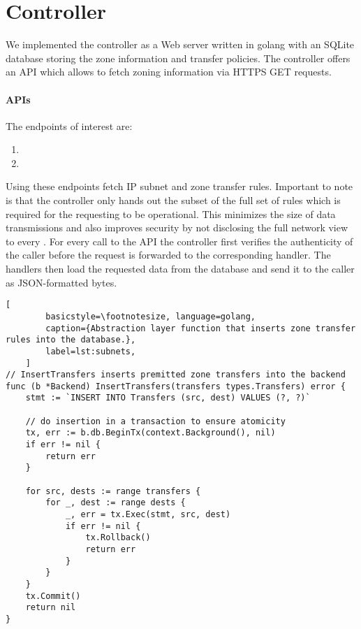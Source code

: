 \section{Controller}
\label{sec:controller}

We implemented the controller as a Web server written in golang with an SQLite database storing the
zone information and transfer policies. The controller offers an API which allows
\tps to fetch zoning information via HTTPS GET requests.

\paragraph{APIs}
The endpoints of interest are:

\begin{enumerate}
	\item {}
	\item {}
\end{enumerate}

Using these endpoints \tps fetch IP subnet and zone transfer rules. Important
to note is that the controller only hands out the subset of the full set of rules
which is required for the requesting \tp to be operational. This minimizes the size
of data transmissions and also improves security by not disclosing the full network
view to every \tp. For every call to the API the controller first verifies the
authenticity of the caller before the request is forwarded to the corresponding
handler. The handlers then load the requested data from the database and send it to
the caller as JSON-formatted bytes.

\begin{minipage}{\linewidth}
	\begin{lstlisting}[
		basicstyle=\footnotesize, language=golang,
		caption={Abstraction layer function that inserts zone transfer rules into the database.},
		label=lst:subnets,
	]
// InsertTransfers inserts premitted zone transfers into the backend
func (b *Backend) InsertTransfers(transfers types.Transfers) error {
	stmt := `INSERT INTO Transfers (src, dest) VALUES (?, ?)`

	// do insertion in a transaction to ensure atomicity
	tx, err := b.db.BeginTx(context.Background(), nil)
	if err != nil {
		return err
	}

	for src, dests := range transfers {
		for _, dest := range dests {
			_, err = tx.Exec(stmt, src, dest)
			if err != nil {
				tx.Rollback()
				return err
			}
		}
	}
	tx.Commit()
	return nil
}
	\end{lstlisting}
\end{minipage}

